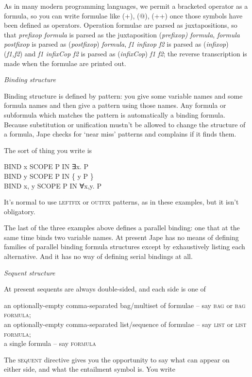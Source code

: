 \documentclass[11pt]{book}
\newcommand{\tab}{\hspace{5mm}}
\begin{document}
As in many modern programming languages, we permit a bracketed operator as a formula, so you can write formulae like (+), (\ensuremath{@}), (++) once those symbols have been defined as operators. Operation formulae are parsed as juxtapositions, so that \textit{prefixop formula} is parsed as the juxtaposition (\textit{prefixop) formula}, \textit{formula postfixop} is parsed as (\textit{postfixop}) \textit{formula}, \textit{f1 infixop f2} is parsed as (\textit{infixop}) (\textit{f1,f2}) and \textit{f1 infixCop f2} is parsed as (\textit{infixCop}) \textit{f1 f2}; the reverse transcription is made when the formulae are printed out.


\textit{Binding structure}


Binding structure is defined by pattern: you give some variable names and some formula names and then give a pattern using those names. Any formula or subformula which matches the pattern is automatically a binding formula. Because substitution or unification mustn't be allowed to change the structure of a formula, Jape checks for `near miss' patterns and complains if it finds them.


The sort of thing you write is

BIND x SCOPE P IN ∃x. P\\
BIND y SCOPE P IN \{ y {\textbar} P \}\\
BIND x, y SCOPE P IN ∀x,y. P


It's normal to use \textsc{leftfix} or \textsc{outfix} patterns, as in these examples, but it isn't obligatory.


The last of the three examples above defines a parallel binding: one that at the same time binds two variable names. At present Jape has no means of defining families of parallel binding formula structures except by exhaustively listing each alternative. And it has no way of defining serial bindings at all.


\textit{Sequent structure}


At present sequents are always double-sided, and each side is one of


{\textbullet}\tab an optionally-empty comma-separated bag/multiset of formulae -- say \textsc{bag} or \textsc{bag formula};\\
{\textbullet}\tab an optionally-empty comma-separated list/sequence of formulae -- say \textsc{list} or \textsc{list formula};\\
{\textbullet}\tab a single formula -- say \textsc{formula}


The \textsc{sequent} directive gives you the opportunity to say what can appear on either side, and what the entailment symbol is. You write
\end{document}

